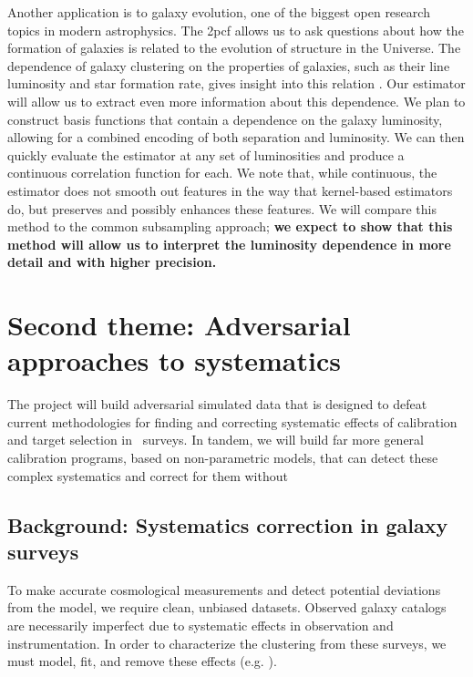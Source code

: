 \documentclass[12pt, fullpage, letterpaper]{article}
\newcommand{\cf}{2pcf\xspace}
\begin{document}
Another application is to galaxy evolution, one of the biggest open research topics in modern astrophysics.
The \cf allows us to ask questions about how the formation of galaxies is related to the evolution of structure in the Universe.
The dependence of galaxy clustering on the properties of galaxies, such as their line luminosity and star formation rate, gives insight into this relation \citep{Zehavi2004}.
Our estimator will allow us to extract even more information about this dependence. 
We plan to construct basis functions that contain a dependence on the galaxy luminosity, allowing for a combined encoding of both separation and luminosity. 
We can then quickly evaluate the estimator at any set of luminosities and produce a continuous correlation function for each. 
We note that, while continuous, the estimator does not smooth out features in the way that kernel-based estimators do, but preserves and possibly enhances these features.
We will compare this method to the common subsampling approach; \textbf{we expect to show that this method will allow us to interpret the luminosity dependence in more detail and with higher precision.}

\section{Second theme: Adversarial approaches to systematics}

The project will build adversarial simulated data that is
designed to defeat current methodologies for finding and correcting
systematic effects of calibration and target selection in \LSS\ 
surveys. 
In tandem, we will build far more general calibration
programs, based on non-parametric models, that can detect these complex systematics and correct for them without

\subsection{Background: Systematics correction in galaxy surveys}

To make accurate cosmological measurements and detect potential deviations from the model, we require clean, unbiased datasets.
Observed galaxy catalogs are necessarily imperfect due to systematic effects in observation and instrumentation. 
In order to characterize the clustering from these surveys, we must model, fit, and remove these effects (e.g. \citealt{Agarwal2014}).
\end{document}
